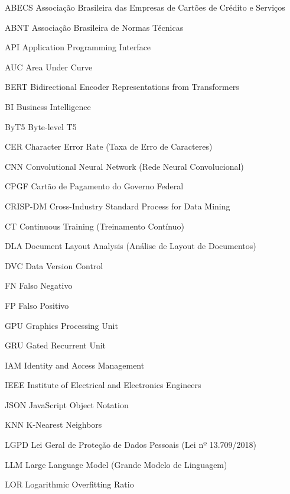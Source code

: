 \documentclass[
	12pt,				
	openright,			
	oneside,			
	a4paper,			
	english,			
	brazil				
	]{abntex2}
\begin{document}
\imprimircapa
\imprimirfolhaderosto

\listoffigures*
\cleardoublepage

\listoftables*
\cleardoublepage

\begin{siglas}
	\item[ABECS] Associação Brasileira das Empresas de Cartões de Crédito e Serviços
	\item[ABNT] Associação Brasileira de Normas Técnicas
	\item[API] Application Programming Interface
	\item[AUC] Area Under Curve
	\item[BERT] Bidirectional Encoder Representations from Transformers
	\item[BI] Business Intelligence
	\item[ByT5] Byte-level T5
	\item[CER] Character Error Rate (Taxa de Erro de Caracteres)
	\item[CNN] Convolutional Neural Network (Rede Neural Convolucional)
	\item[CPGF] Cartão de Pagamento do Governo Federal
	\item[CRISP-DM] Cross-Industry Standard Process for Data Mining
	\item[CT] Continuous Training (Treinamento Contínuo)
	\item[DLA] Document Layout Analysis (Análise de Layout de Documentos)
	\item[DVC] Data Version Control
	\item[FN] Falso Negativo
	\item[FP] Falso Positivo
	\item[GPU] Graphics Processing Unit
	\item[GRU] Gated Recurrent Unit
	\item[IAM] Identity and Access Management
	\item[IEEE] Institute of Electrical and Electronics Engineers
	\item[JSON] JavaScript Object Notation
	\item[KNN] K-Nearest Neighbors
	\item[LGPD] Lei Geral de Proteção de Dados Pessoais (Lei nº 13.709/2018)
	\item[LLM] Large Language Model (Grande Modelo de Linguagem)
	\item[LOR] Logarithmic Overfitting Ratio

\end{siglas}
\end{document}
